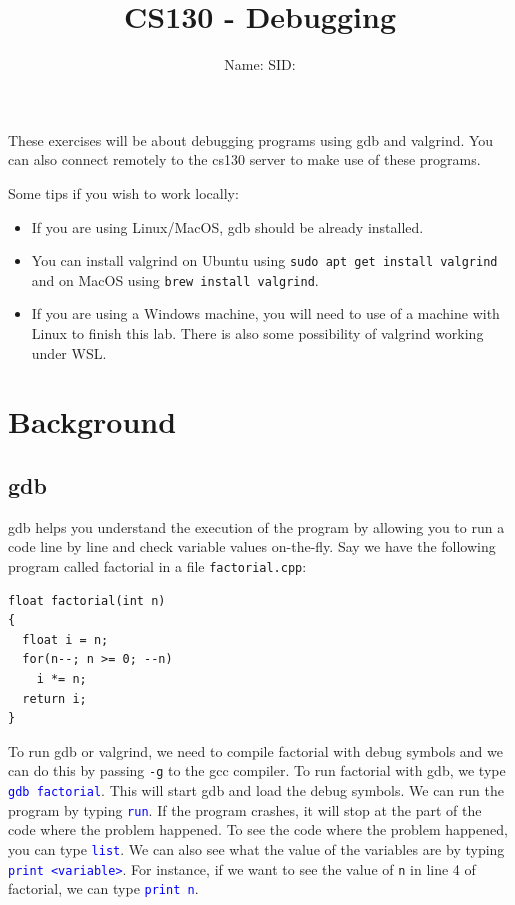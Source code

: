 \documentclass[12pt]{article}
\newcounter{problem}
\newcommand{\TODOL}[1]{\textcolor{red}{\underline{\hspace{#1 cm}}}}
\begin{document}
\title{CS130 - Debugging}
\date{}
\author{Name: \TODOL7\qquad\qquad SID: \TODOL4}
\maketitle
\begin{center}
\end{center}

\newcommand{\CM}[1]{\textcolor{blue}{\texttt{#1}}}

These exercises will be about debugging programs using gdb and valgrind.  You
can also connect remotely to the cs130 server to make use of these programs.

Some tips if you wish to work locally:
\begin{itemize}
\item If you are using Linux/MacOS, gdb should be already installed. 
\item You can install valgrind on Ubuntu using \texttt{sudo apt get install valgrind} and on MacOS using \texttt{brew install valgrind}. 
\item If you are using a Windows machine, you will need to use of a machine with Linux to finish this lab.  There is also some possibility of valgrind working under WSL.
\end{itemize}


\section{Background}
\subsection*{gdb}

gdb helps you understand the execution of the program by allowing you to run a
code line by line and check variable values on-the-fly. Say we have the
following program called factorial in a file \texttt{factorial.cpp}:

\begin{lstlisting}
float factorial(int n)
{
  float i = n;
  for(n--; n >= 0; --n)
    i *= n;
  return i;
}
\end{lstlisting}

To run gdb or valgrind, we need to compile factorial with debug symbols and we
can do this by passing \texttt{-g} to the gcc compiler.  To run factorial with
gdb, we type \CM{gdb factorial}.  This will start gdb and load the debug symbols. We
can run the program by typing \CM{run}. If the program crashes, it will stop at the
part of the code where the problem happened. To see the code where the problem
happened, you can type \CM{list}. We can also see what the value of the variables are
by typing \CM{print <variable>}.  For instance, if we want to see the value
of \texttt{n} in line 4 of factorial, we can type \CM{print n}.
\end{document}
